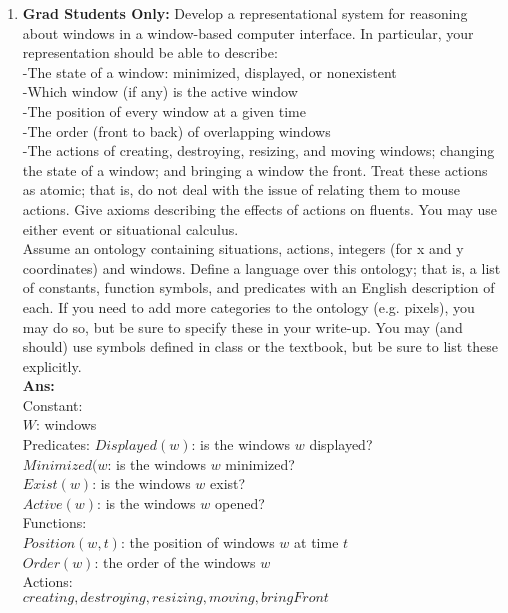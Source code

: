 \documentclass[12pt]{article}
\begin{document}
\begin{enumerate}
\item{\textbf{Grad Students Only:} Develop a representational system for reasoning about windows in a window-based computer interface. In particular, your representation should be able to describe: \\
-The state of a window: minimized, displayed, or nonexistent \\
-Which window (if any) is the active window \\
-The position of every window at a given time \\
-The order (front to back) of overlapping windows \\
-The actions of creating, destroying, resizing, and moving windows; changing the state of a window; and bringing a window the front. Treat these actions as atomic; that is, do not deal with the issue of relating them to mouse actions. Give axioms describing the effects of actions on fluents. You may use either event or situational calculus. \\
Assume an ontology containing situations, actions, integers (for x and y coordinates) and windows. Define a language over this ontology; that is, a list of constants, function symbols, and predicates with an English description of each. If you need to add more categories to the ontology (e.g. pixels), you may do so, but be sure to specify these in your write-up. You may (and should) use symbols defined in class or the textbook, but be sure to list these explicitly.}\\
\textbf{Ans:}\\
Constant:\\
$W$: windows\\

Predicates:
$Displayed(w)$: is the windows $w$ displayed?\\
$Minimized(w$: is the windows $w$ minimized?\\
$Exist(w)$: is the windows $w$ exist?\\
$Active(w)$: is the windows $w$ opened?\\

Functions:\\
$Position(w, t)$: the position of windows $w$ at time $t$\\
$Order(w)$: the order of the windows $w$\\

Actions:\\
$creating, destroying, resizing, moving, bringFront$\\


\end{enumerate}
\end{document}
